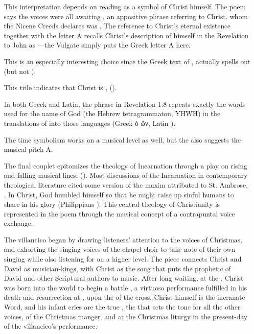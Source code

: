This interpretation depends on reading  as a symbol of Christ himself.
The poem says the voices were all awaiting , an appositive phrase referring to Christ, whom the Nicene
Creeds declares was .%
    \Autocite
    []
    [42]
    {Catholic:Catechismus1614}
The reference to Christ's eternal existence together with the letter A recalls
Christ's description of himself in the Revelation to John as
---the Vulgate simply puts the Greek
letter A here.%
\begin{Footnote}
    This is an especially interesting choice since the Greek text of
    , actually spells out  (but not
    ).
\end{Footnote}
This title indicates that Christ is ,
 ().%
    \begin{Footnote}
        In both Greek and Latin, the phrase in Revelation 1:8 repeats exactly
        the words used for the name of God (the Hebrew tetragrammaton, YHWH) in
        the translations of  into those languages (Greek
        \textgreek{ὁ ὤν}, Latin ).
    \end{Footnote}
The time symbolism works on a musical level as well, but the 
also suggests the musical pitch A.

The final couplet epitomizes the theology of Incarnation through a play on
rising and falling musical lines:  ().
Most discussions of the Incarnation in contemporary theological literature cited
some version of the maxim attributed to St. Ambrose\XXX, . 
In Christ, God humbled himself so that he might raise up sinful humans to share
in his glory (Philippians \XXX). 
This central theology of Christianity is represented in the poem through the
musical concept of a contrapuntal voice exchange.

The villancico began by drawing listeners' attention to the voices of Christmas,
and exhorting the singing voices of the chapel choir to take note of their own
singing while also listening for  on a higher level.
The piece connects Christ and David as musician-kings, with Christ as the song
that puts the prophetic  of David and other Scriptural authors to
music.
After long waiting, at the , Christ was born into the
world to begin a battle , a virtuoso performance fulfilled in
his death and resurrection at , upon the 
of the cross.
Christ himself is the incranate Word, and his infant cries are the true
, the  that sets the tone for all the other
voices,  of the Christmas manger, and at the
Christmas liturgy in the present-day of the villancico's performance.

